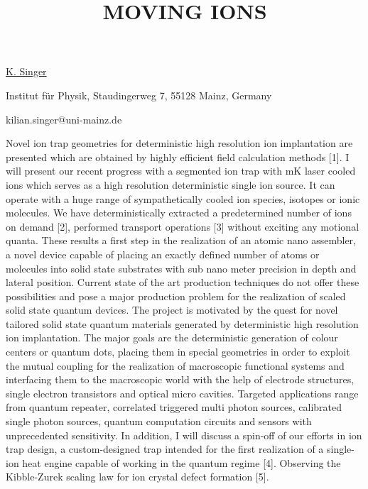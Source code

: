 \title{MOVING IONS}

\underline{K. Singer} 

{\normalsize{\vspace{-4mm}}
Institut f\"{u}r Physik, Staudingerweg 7, 55128 Mainz, Germany

\email kilian.singer@uni-mainz.de}

Novel ion trap geometries for deterministic high resolution ion implantation are presented which are
obtained by highly efficient field calculation methods [1]. I will present our recent progress with
a segmented ion trap with mK laser cooled ions which serves as a high resolution deterministic
single ion source. It can operate with a huge range of sympathetically cooled ion species, isotopes
or ionic molecules. We have deterministically extracted a predetermined number of ions on demand
[2], performed transport operations [3] without exciting any motional quanta. These results a first
step in the realization of an atomic nano assembler, a novel device capable of placing an exactly
defined number of atoms or molecules into solid state substrates with sub nano meter precision in
depth and lateral position. Current state of the art production techniques do not offer these
possibilities and pose a major production problem for the realization of scaled solid state quantum
devices. The project is motivated by the quest for novel tailored solid state quantum materials
generated by deterministic high resolution ion implantation. The major goals are the deterministic
generation of colour centers or quantum dots, placing them in special geometries in order to exploit
the mutual coupling for the realization of macroscopic functional systems and interfacing them to
the macroscopic world with the help of electrode structures, single electron transistors and optical
micro cavities. Targeted applications range from quantum repeater, correlated triggered multi photon
sources, calibrated single photon sources, quantum computation circuits and sensors with
unprecedented sensitivity. In addition, I will discuss a spin-off of our efforts in ion trap design,
a custom-designed trap intended for the first realization of a single-ion heat engine capable of
working in the quantum regime [4]. Observing the Kibble-Zurek scaling law for ion crystal defect formation [5].

